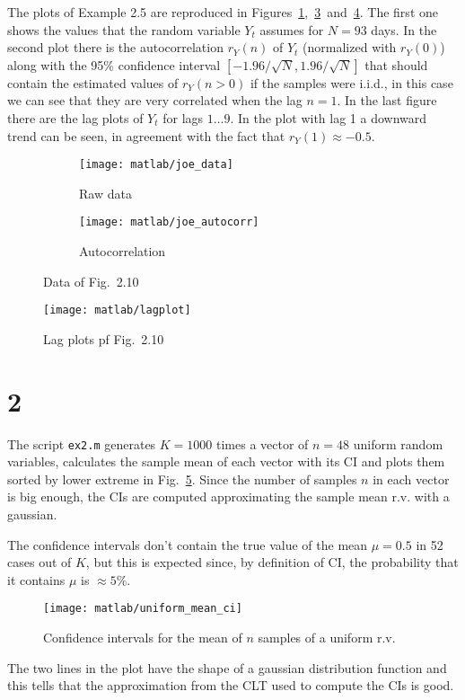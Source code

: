 \documentclass{article}
\newcommand{\inlinecode}[1]{\lstinline[basicstyle=\ttfamily,keywordstyle={}]{#1}}
\begin{document}
The plots of Example 2.5 are reproduced in
Figures~\ref{joe_data},~\ref{joe_autocorr}~and~\ref{joe_lagplot}. The
first one shows the values that the random variable $Y_t$ assumes
for $N = 93$ days. In the second plot there is the autocorrelation
$r_Y(n)$ of $Y_t$ (normalized with $r_Y(0)$) along with the 95\%
confidence interval $[-1.96/\sqrt{N}, 1.96/\sqrt{N}]$ that should
contain the estimated values of $r_Y(n>0)$ if the samples were
i.i.d., in this case we can see that they are very correlated when
the lag $n=1$.  In the last figure there are the lag plots of
$Y_t$ for lags $1\dots9$. In the plot with lag 1 a downward trend
can be seen, in agreement with the fact that $r_Y(1) \approx
-0.5$.
\begin{figure}[htbp]
  \centering
  \begin{subfigure}{.5\textwidth}
    \centering
    \texttt{[image: matlab/joe\_data]}
    \caption{Raw data}
    \label{joe_data}
  \end{subfigure}%
  \begin{subfigure}{.5\textwidth}
    \centering
    \texttt{[image: matlab/joe\_autocorr]}
    \caption{Autocorrelation}
    \label{joe_autocorr}
  \end{subfigure}
  \caption{Data of Fig.~2.10}
\end{figure}
\begin{figure}[htbp]
  \centering
  \texttt{[image: matlab/lagplot]}
  \caption{Lag plots pf Fig.~2.10}
  \label{joe_lagplot}
\end{figure}

\section*{2}
The script \inlinecode{ex2.m} generates $K=1000$ times a vector of
$n=48$ uniform random variables, calculates the sample mean of each
vector with its CI and plots them sorted by lower extreme in
Fig.~\ref{uniform_mean_ci}. Since the number of samples $n$ in each
vector is big enough, the CIs are computed approximating the sample
mean r.v. with a gaussian.

The confidence intervals don't contain the true value of the mean
$\mu=0.5$ in 52 cases out of $K$, but this is expected since, by
definition of CI, the probability that it contains $\mu$ is $\approx
5\%$.
\begin{figure}[htbp]
  \centering
  \texttt{[image: matlab/uniform\_mean\_ci]}
  \caption{Confidence intervals for the mean of $n$ samples of a uniform r.v.}
  \label{uniform_mean_ci}
\end{figure}
The two lines in the plot have the shape of a gaussian distribution
function and this tells that the approximation from the CLT used to
compute the CIs is good.
\end{document}

